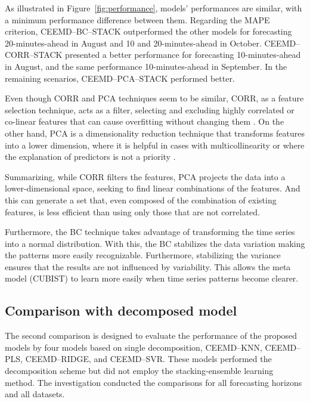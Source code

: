 As illustrated in Figure~\ref{fig:performance}, models' performances are similar, with a minimum performance difference between them. Regarding the \ac{MAPE} criterion, \ac{CEEMD}--\ac{BC}--\ac{STACK} outperformed the other models for forecasting 20-minutes-ahead in August and 10 and 20-minutes-ahead in October. \ac{CEEMD}--\ac{CORR}--\ac{STACK} presented a better performance for forecasting 10-minutes-ahead in August, and the same performance 10-minutes-ahead in September. In the remaining scenarios, \ac{CEEMD}--\ac{PCA}--\ac{STACK} performed better.

Even though \ac{CORR} and \ac{PCA} techniques seem to be similar, \ac{CORR}, as a feature selection technique, acts as a filter, selecting and excluding highly correlated or co-linear features that can cause overfitting without changing them \cite{hu2020Multilabel, ma2020Filterbased}. On the other hand, \ac{PCA} is a dimensionality reduction technique that transforms features into a lower dimension, where it is helpful in cases with multicollinearity or where the explanation of predictors is not a priority \cite{marsboom2018Using, salem2019Data}. 

Summarizing, while \ac{CORR} filters the features, \ac{PCA} projects the data into a lower-dimensional space, seeking to find linear combinations of the features. And this can generate a set that, even composed of the combination of existing features, is less efficient than using only those that are not correlated.

Furthermore, the \ac{BC} technique takes advantage of transforming the time series into a normal distribution. With this, the \ac{BC} stabilizes the data variation making the patterns more easily recognizable. Furthermore, stabilizing the variance ensures that the results are not influenced by variability. This allows the meta model (\ac{CUBIST}) to learn more easily when time series patterns become clearer.

\subsection{Comparison with decomposed model \label{subsec:propVSdecomp}}

The second comparison is designed to evaluate the performance of the proposed models by four models based on single decomposition, \ac{CEEMD}--\ac{KNN}, \ac{CEEMD}--\ac{PLS}, \ac{CEEMD}--\ac{RIDGE}, and \ac{CEEMD}--\ac{SVR}. These models performed the decomposition scheme but did not employ the stacking-ensemble learning method. The investigation conducted the comparisons for all forecasting horizons and all datasets.

